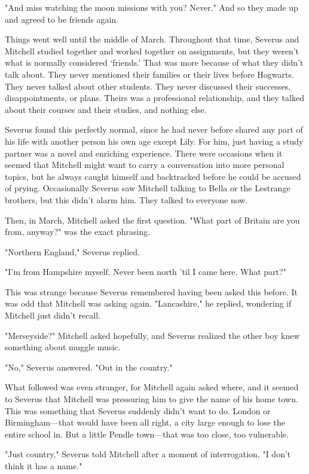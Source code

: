 "And miss watching the moon missions with you? Never." And so they made up and agreed to be friends again.

Things went well until the middle of March. Throughout that time, Severus and Mitchell studied together and worked together on assignments, but they weren't what is normally considered `friends.' That was more because of what they didn't talk about. They never mentioned their families or their lives before Hogwarts. They never talked about other students. They never discussed their successes, disappointments, or plans. Theirs was a professional relationship, and they talked about their courses and their studies, and nothing else.

Severus found this perfectly normal, since he had never before shared any part of his life with another person his own age except Lily. For him, just having a study partner was a novel and enriching experience. There were occasions when it seemed that Mitchell might want to carry a conversation into more personal topics, but he always caught himself and backtracked before he could be accused of prying. Occasionally Severus saw Mitchell talking to Bella or the Lestrange brothers, but this didn't alarm him. They talked to everyone now.

Then, in March, Mitchell asked the first question. "What part of Britain are you from, anyway?" was the exact phrasing.

"Northern England," Severus replied.

"I'm from Hampshire myself. Never been north 'til I came here. What part?"

This was strange because Severus remembered having been asked this before. It was odd that Mitchell was asking again. "Lancashire," he replied, wondering if Mitchell just didn't recall.

"Merseyside?" Mitchell asked hopefully, and Severus realized the other boy knew something about muggle music.

"No," Severus answered. "Out in the{\el} country."

What followed was even stranger, for Mitchell again asked where, and it seemed to Severus that Mitchell was pressuring him to give the name of his home town. This was something that Severus suddenly didn't want to do. London or Birmingham—that would have been all right, a city large enough to lose the entire school in. But a little Pendle town—that was too close, too vulnerable.

"Just{\el} country," Severus told Mitchell after a moment of interrogation. "I don't{\el} think it has a{\el} name."

